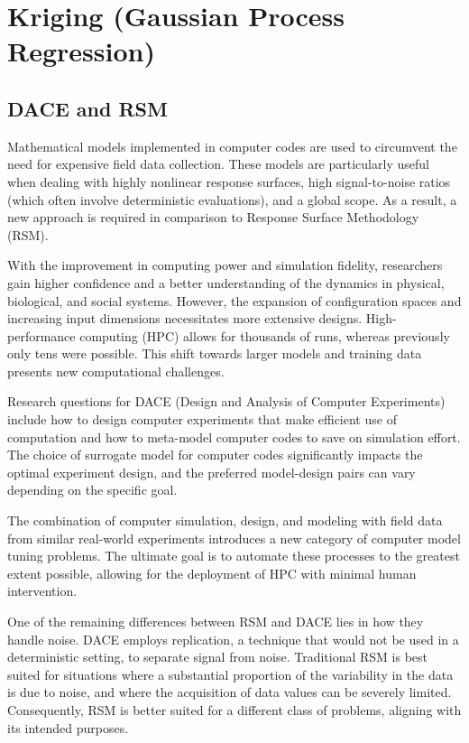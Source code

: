 \documentclass[
  letterpaper,
  DIV=11,
  numbers=noendperiod]{scrreprt}
\begin{document}
\chapter{Kriging (Gaussian Process
Regression)}\label{kriging-gaussian-process-regression}

\section{DACE and RSM}\label{dace-and-rsm}

Mathematical models implemented in computer codes are used to circumvent
the need for expensive field data collection. These models are
particularly useful when dealing with highly nonlinear response
surfaces, high signal-to-noise ratios (which often involve deterministic
evaluations), and a global scope. As a result, a new approach is
required in comparison to Response Surface Methodology (RSM).

With the improvement in computing power and simulation fidelity,
researchers gain higher confidence and a better understanding of the
dynamics in physical, biological, and social systems. However, the
expansion of configuration spaces and increasing input dimensions
necessitates more extensive designs. High-performance computing (HPC)
allows for thousands of runs, whereas previously only tens were
possible. This shift towards larger models and training data presents
new computational challenges.

Research questions for DACE (Design and Analysis of Computer
Experiments) include how to design computer experiments that make
efficient use of computation and how to meta-model computer codes to
save on simulation effort. The choice of surrogate model for computer
codes significantly impacts the optimal experiment design, and the
preferred model-design pairs can vary depending on the specific goal.

The combination of computer simulation, design, and modeling with field
data from similar real-world experiments introduces a new category of
computer model tuning problems. The ultimate goal is to automate these
processes to the greatest extent possible, allowing for the deployment
of HPC with minimal human intervention.

One of the remaining differences between RSM and DACE lies in how they
handle noise. DACE employs replication, a technique that would not be
used in a deterministic setting, to separate signal from noise.
Traditional RSM is best suited for situations where a substantial
proportion of the variability in the data is due to noise, and where the
acquisition of data values can be severely limited. Consequently, RSM is
better suited for a different class of problems, aligning with its
intended purposes.
\end{document}
